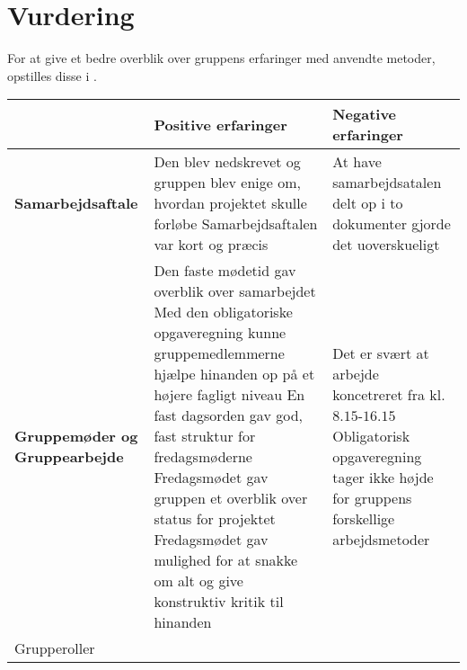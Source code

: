 \section{Vurdering}
For at give et bedre overblik over gruppens erfaringer med anvendte metoder, opstilles disse i .

\begin{table}[h]
	\label{Samvur}
	\begin{tabular}{|l|p{5cm}|p{5cm}||}
		\hline
    	&\textbf{Positive erfaringer}                               &  \textbf{Negative erfaringer}                                                               \\ \hline
		\multicolumn{1}{|l|}{\textbf{Samarbejdsaftale}}             & 
		    	Den blev nedskrevet og gruppen blev enige om, hvordan projektet skulle forløbe                                                                        \newline 
		    	Samarbejdsaftalen var kort og præcis                &  At have samarbejdsatalen delt op i to dokumenter gjorde det uoverskueligt                   \\ \hline
		\multicolumn{1}{|l|}{\textbf{Gruppemøder og Gruppearbejde}} &  
		        Den faste mødetid gav overblik over samarbejdet                                                                                                       \newline
		     	Med den obligatoriske opgaveregning kunne gruppemedlemmerne hjælpe hinanden op på et højere fagligt niveau                                            \newline
		     	En fast dagsorden gav god, fast struktur for fredagsmøderne                                                                                           \newline
		        Fredagsmødet gav gruppen et overblik over status for projektet                                                                                        \newline
		        Fredagsmødet gav mulighed for at snakke om alt og give konstruktiv kritik til hinanden
		                                                           &   Det er svært at arbejde koncetreret fra kl. $8.15$-$16.15$                                     \newline
		                                                    	       Obligatorisk opgaveregning tager ikke højde for gruppens forskellige arbejdsmetoder         \\ \hline
		\multicolumn{1}{|l|}{Grupperoller}                         &

\end{tabular}
\end{table}
